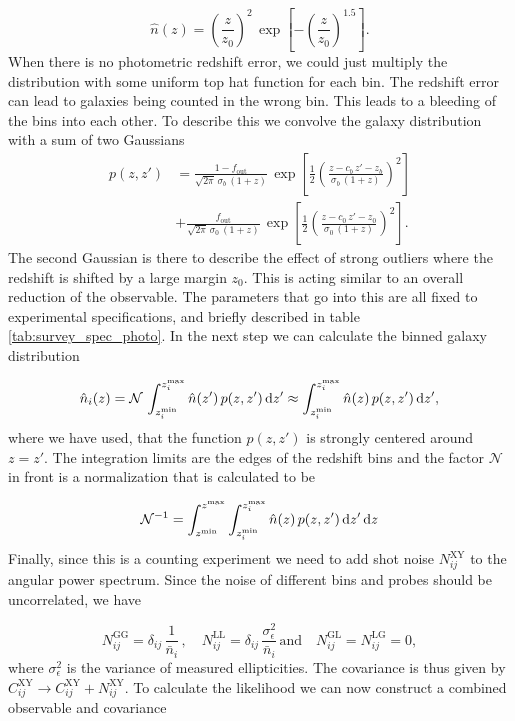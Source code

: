\documentclass[../main.tex]{subfiles}
\begin{document}
 \begin{equation}
    \hat{n}(z) = \left(\frac{z}{z_0}\right)^2\,\exp\left[-\left(\frac{z}{z_0}\right)^{1.5}\right].
 \end{equation} 
 When there is no photometric redshift error, we could just multiply the distribution with some uniform top hat function for each bin. The redshift error can lead to galaxies being counted in the wrong bin. This leads to a bleeding of the bins into each other. To describe this we convolve the galaxy distribution with a sum of two Gaussians
 \begin{align}
    p(z,z') &= \frac{1-f_\mathrm{out}}{\sqrt{2\pi}\,\sigma_b\,(1+z)}\,\exp\left[\frac{1}{2}\left(\frac{z-c_b\,z'-z_b}{\sigma_b\,(1+z)}\right)^2\right] \nonumber\\
    &+ \frac{f_\mathrm{out}}{\sqrt{2\pi}\,\sigma_0\,(1+z)}\,\exp\left[\frac{1}{2}\left(\frac{z-c_0\,z'-z_0}{\sigma_0\,(1+z)}\right)^2\right].
 \end{align}
 The second Gaussian is there to describe the effect of strong outliers where the redshift is shifted by a large margin $z_0$. This is acting similar to an overall reduction of the observable. The parameters that go into this are all fixed to experimental specifications, and briefly described in table \ref{tab:survey_spec_photo}. In the next step we can calculate the binned galaxy distribution 

 \begin{equation}
    \hat{n}_i(z) = \mathcal{N}\, \int_{z_i^\mathrm{min}}^{z_i^\mathrm{max}} \hat{n}(z')\, p(z,z')\,\mathrm{d} z' \approx \int_{z_i^\mathrm{min}}^{z_i^\mathrm{max}} \hat{n}(z)\, p(z,z')\,\mathrm{d} z' ,
 \end{equation}
 where we have used, that the function $p(z,z')$ is strongly centered around $z=z'$. The integration limits are the edges of the redshift bins and the factor $\mathcal{N}$ in front is a normalization that is calculated to be  
 
 \begin{equation}
    \mathcal{N}^{-1} = \int_{z^\mathrm{min}}^{z^\mathrm{max}} \int_{z_i^\mathrm{min}}^{z_i^\mathrm{max}} \hat{n}(z)\, p(z,z')\,\mathrm{d} z'\,\mathrm{d} z
 \end{equation}
 Finally, since this is a counting experiment we need to add shot noise $N^\mathrm{XY}_{ij}$ to the angular power spectrum. Since the noise of different bins and probes should be uncorrelated, we have

 \begin{equation}
    N^\mathrm{GG}_{ij} = \delta_{ij}\,\frac{1}{\bar{n}_i}\, ,\quad N^\mathrm{LL}_{ij} = \delta_{ij}\,\frac{\sigma^2_\epsilon}{\bar{n}_i}\,\text{and}\quad N^\mathrm{GL}_{ij} = N^\mathrm{LG}_{ij} = 0,
 \end{equation}
 where $\sigma^2_\epsilon$ is the variance of measured ellipticities. The covariance is thus given by $C^\mathrm{XY}_{ij} \to C^\mathrm{XY}_{ij}+N^\mathrm{XY}_{ij}$.
 To calculate the likelihood we can now construct a combined observable and covariance 
 
\end{document}
